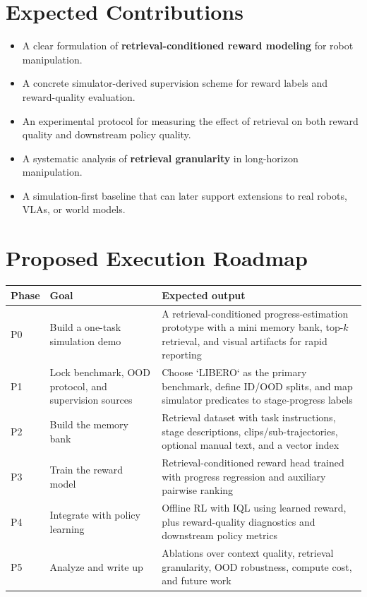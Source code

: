 \section{Expected Contributions}

\begin{itemize}
  \item A clear formulation of \textbf{retrieval-conditioned reward modeling} for robot manipulation.
  \item A concrete simulator-derived supervision scheme for reward labels and reward-quality evaluation.
  \item An experimental protocol for measuring the effect of retrieval on both reward quality and downstream policy quality.
  \item A systematic analysis of \textbf{retrieval granularity} in long-horizon manipulation.
  \item A simulation-first baseline that can later support extensions to real robots, VLAs, or world models.
\end{itemize}

\section{Proposed Execution Roadmap}

\begin{longtable}{p{2.1cm}p{4.0cm}p{7.6cm}}
  \toprule
  Phase & Goal & Expected output \\
  \midrule
  P0 & Build a one-task simulation demo & A retrieval-conditioned progress-estimation prototype with a mini memory bank, top-$k$ retrieval, and visual artifacts for rapid reporting \\
  P1 & Lock benchmark, OOD protocol, and supervision sources & Choose `LIBERO` as the primary benchmark, define ID/OOD splits, and map simulator predicates to stage-progress labels \\
  P2 & Build the memory bank & Retrieval dataset with task instructions, stage descriptions, clips/sub-trajectories, optional manual text, and a vector index \\
  P3 & Train the reward model & Retrieval-conditioned reward head trained with progress regression and auxiliary pairwise ranking \\
  P4 & Integrate with policy learning & Offline RL with IQL using learned reward, plus reward-quality diagnostics and downstream policy metrics \\
  P5 & Analyze and write up & Ablations over context quality, retrieval granularity, OOD robustness, compute cost, and future work \\
  \bottomrule
\end{longtable}

